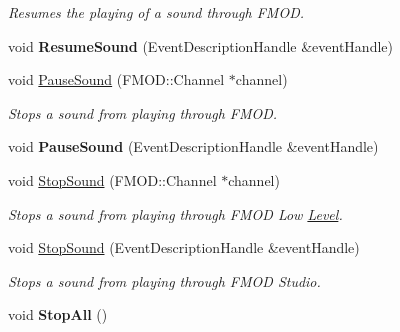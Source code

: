 \begin{DoxyCompactItemize}
\begin{DoxyCompactList}\small\item\em Resumes the playing of a sound through F\-M\-O\-D. \end{DoxyCompactList}\item 
\hypertarget{classDCEngine_1_1Systems_1_1AudioFMOD_af4f086e8b9b8c7c49dc905ca7e292937}{void {\bfseries Resume\-Sound} (Event\-Description\-Handle \&event\-Handle)}\label{classDCEngine_1_1Systems_1_1AudioFMOD_af4f086e8b9b8c7c49dc905ca7e292937}

\item 
\hypertarget{classDCEngine_1_1Systems_1_1AudioFMOD_a01bf69a8da963ba4b622378f81f50858}{void \hyperlink{classDCEngine_1_1Systems_1_1AudioFMOD_a01bf69a8da963ba4b622378f81f50858}{Pause\-Sound} (F\-M\-O\-D\-::\-Channel $\ast$channel)}\label{classDCEngine_1_1Systems_1_1AudioFMOD_a01bf69a8da963ba4b622378f81f50858}

\begin{DoxyCompactList}\small\item\em Stops a sound from playing through F\-M\-O\-D. \end{DoxyCompactList}\item 
\hypertarget{classDCEngine_1_1Systems_1_1AudioFMOD_abd17e801ce9ad5e42478a456387601ba}{void {\bfseries Pause\-Sound} (Event\-Description\-Handle \&event\-Handle)}\label{classDCEngine_1_1Systems_1_1AudioFMOD_abd17e801ce9ad5e42478a456387601ba}

\item 
\hypertarget{classDCEngine_1_1Systems_1_1AudioFMOD_a9d26255a2b865097ca482ee6b5f07756}{void \hyperlink{classDCEngine_1_1Systems_1_1AudioFMOD_a9d26255a2b865097ca482ee6b5f07756}{Stop\-Sound} (F\-M\-O\-D\-::\-Channel $\ast$channel)}\label{classDCEngine_1_1Systems_1_1AudioFMOD_a9d26255a2b865097ca482ee6b5f07756}

\begin{DoxyCompactList}\small\item\em Stops a sound from playing through F\-M\-O\-D Low \hyperlink{classDCEngine_1_1Level}{Level}. \end{DoxyCompactList}\item 
\hypertarget{classDCEngine_1_1Systems_1_1AudioFMOD_a3a35f0d255c26328650b23461bd2981e}{void \hyperlink{classDCEngine_1_1Systems_1_1AudioFMOD_a3a35f0d255c26328650b23461bd2981e}{Stop\-Sound} (Event\-Description\-Handle \&event\-Handle)}\label{classDCEngine_1_1Systems_1_1AudioFMOD_a3a35f0d255c26328650b23461bd2981e}

\begin{DoxyCompactList}\small\item\em Stops a sound from playing through F\-M\-O\-D Studio. \end{DoxyCompactList}\item 
\hypertarget{classDCEngine_1_1Systems_1_1AudioFMOD_ada4aad9a3e46fcfdb442299577d7fd92}{void {\bfseries Stop\-All} ()}\label{classDCEngine_1_1Systems_1_1AudioFMOD_ada4aad9a3e46fcfdb442299577d7fd92}


\end{DoxyCompactItemize}
